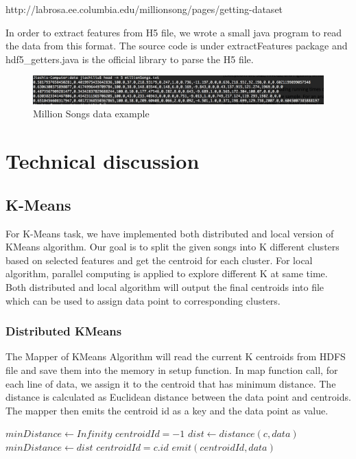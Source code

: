 \documentclass[11pt]{article} %
\begin{document}
http://labrosa.ee.columbia.edu/millionsong/pages/getting-dataset

In order to extract features from H5 file, we wrote a small java program to read the data from this format. The source code is under extractFeatures package and hdf5\_getters.java is the official library to parse the H5 file.

\begin{figure}[htbp]
\begin{center}
\includegraphics[scale=0.4]{millionsongs.png}
\caption{Million Songs data example}
\label{fig:msd}
\end{center}
\end{figure}

\section{Technical discussion}
\subsection{K-Means}
For K-Means task, we have implemented both distributed and local version of KMeans algorithm. Our goal is to split the given songs into K different clusters based on selected features and get the centroid for each cluster. For local algorithm, parallel computing is applied to explore different K at same time. Both distributed and local algorithm will output the final centroids into file which can be used to assign data point to corresponding clusters. 

\subsubsection{Distributed KMeans}
The Mapper of KMeans Algorithm will read the current K centroids from HDFS file and save them into the memory in setup function. In map function call, for each line of data, we assign it to the centroid that has minimum distance. The distance is calculated as Euclidean distance between the data point and centroids. The mapper then emits the centroid id as a key and the data point as value.

\begin{algorithmic}[1]
\State $minDistance \gets Infinity$
\State $centroidId = -1$
	\State $dist \gets distance(c, data)$
		\State $minDistance \gets dist$
		\State $centroidId = c.id$
	\EndIf
\EndFor
\State $emit(centroidId, data)$
\EndFunction
\end{algorithmic}
\end{document}
